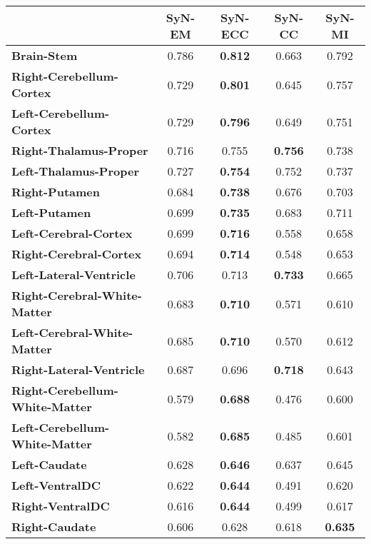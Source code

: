 \begin{table}[htbp]
  \centering
  {\small
    \begin{tabular}{lcccc}
    \toprule
          & \textbf{SyN-EM} & \textbf{SyN-ECC} & \textbf{SyN-CC} & \textbf{SyN-MI} \\
    \midrule
    \textbf{Brain-Stem} & 0.786 & \textbf{0.812} & 0.663 & 0.792 \\
    \textbf{Right-Cerebellum-Cortex} & 0.729 & \textbf{0.801} & 0.645 & 0.757 \\
    \textbf{Left-Cerebellum-Cortex} & 0.729 & \textbf{0.796} & 0.649 & 0.751 \\
    \textbf{Right-Thalamus-Proper} & 0.716 & 0.755 & \textbf{0.756} & 0.738 \\
    \textbf{Left-Thalamus-Proper} & 0.727 & \textbf{0.754} & 0.752 & 0.737 \\
    \textbf{Right-Putamen} & 0.684 & \textbf{0.738} & 0.676 & 0.703 \\
    \textbf{Left-Putamen} & 0.699 & \textbf{0.735} & 0.683 & 0.711 \\
    \textbf{Left-Cerebral-Cortex} & 0.699 & \textbf{0.716} & 0.558 & 0.658 \\
    \textbf{Right-Cerebral-Cortex} & 0.694 & \textbf{0.714} & 0.548 & 0.653 \\
    \textbf{Left-Lateral-Ventricle} & 0.706 & 0.713 & \textbf{0.733} & 0.665 \\
    \textbf{Right-Cerebral-White-Matter} & 0.683 & \textbf{0.710} & 0.571 & 0.610 \\
    \textbf{Left-Cerebral-White-Matter} & 0.685 & \textbf{0.710} & 0.570 & 0.612 \\
    \textbf{Right-Lateral-Ventricle} & 0.687 & 0.696 & \textbf{0.718} & 0.643 \\
    \textbf{Right-Cerebellum-White-Matter} & 0.579 & \textbf{0.688} & 0.476 & 0.600 \\
    \textbf{Left-Cerebellum-White-Matter} & 0.582 & \textbf{0.685} & 0.485 & 0.601 \\
    \textbf{Left-Caudate} & 0.628 & \textbf{0.646} & 0.637 & 0.645 \\
    \textbf{Left-VentralDC} & 0.622 & \textbf{0.644} & 0.491 & 0.620 \\
    \textbf{Right-VentralDC} & 0.616 & \textbf{0.644} & 0.499 & 0.617 \\
    \textbf{Right-Caudate} & 0.606 & 0.628 & 0.618 & \textbf{0.635} \\

\end{tabular}}
\end{table}
